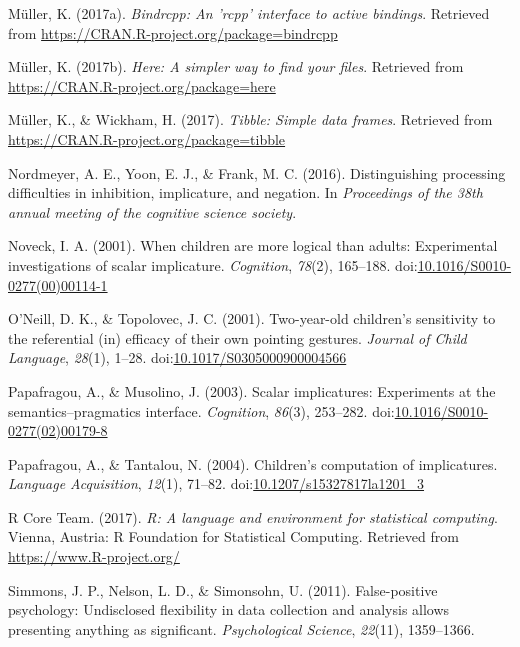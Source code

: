 \documentclass[mask,man]{apa6}
\theoremstyle{definition}
\theoremstyle{definition}
\theoremstyle{definition}
\theoremstyle{remark}
\begin{document}
\hypertarget{ref-R-bindrcpp}{}
Müller, K. (2017a). \emph{Bindrcpp: An 'rcpp' interface to active
bindings}. Retrieved from
\url{https://CRAN.R-project.org/package=bindrcpp}

\hypertarget{ref-R-here}{}
Müller, K. (2017b). \emph{Here: A simpler way to find your files}.
Retrieved from \url{https://CRAN.R-project.org/package=here}

\hypertarget{ref-R-tibble}{}
Müller, K., \& Wickham, H. (2017). \emph{Tibble: Simple data frames}.
Retrieved from \url{https://CRAN.R-project.org/package=tibble}

\hypertarget{ref-nordmeyer2016}{}
Nordmeyer, A. E., Yoon, E. J., \& Frank, M. C. (2016). Distinguishing
processing difficulties in inhibition, implicature, and negation. In
\emph{Proceedings of the 38th annual meeting of the cognitive science
society}.

\hypertarget{ref-noveck2001}{}
Noveck, I. A. (2001). When children are more logical than adults:
Experimental investigations of scalar implicature. \emph{Cognition},
\emph{78}(2), 165--188.
doi:\href{https://doi.org/10.1016/S0010-0277(00)00114-1}{10.1016/S0010-0277(00)00114-1}

\hypertarget{ref-oneill2001}{}
O'Neill, D. K., \& Topolovec, J. C. (2001). Two-year-old children's
sensitivity to the referential (in) efficacy of their own pointing
gestures. \emph{Journal of Child Language}, \emph{28}(1), 1--28.
doi:\href{https://doi.org/10.1017/S0305000900004566}{10.1017/S0305000900004566}

\hypertarget{ref-papafragou2003}{}
Papafragou, A., \& Musolino, J. (2003). Scalar implicatures: Experiments
at the semantics--pragmatics interface. \emph{Cognition}, \emph{86}(3),
253--282.
doi:\href{https://doi.org/10.1016/S0010-0277(02)00179-8}{10.1016/S0010-0277(02)00179-8}

\hypertarget{ref-papafragou2004}{}
Papafragou, A., \& Tantalou, N. (2004). Children's computation of
implicatures. \emph{Language Acquisition}, \emph{12}(1), 71--82.
doi:\href{https://doi.org/10.1207/s15327817la1201_3}{10.1207/s15327817la1201\_3}

\hypertarget{ref-R-base}{}
R Core Team. (2017). \emph{R: A language and environment for statistical
computing}. Vienna, Austria: R Foundation for Statistical Computing.
Retrieved from \url{https://www.R-project.org/}

\hypertarget{ref-simmons2011false}{}
Simmons, J. P., Nelson, L. D., \& Simonsohn, U. (2011). False-positive
psychology: Undisclosed flexibility in data collection and analysis
allows presenting anything as significant. \emph{Psychological Science},
\emph{22}(11), 1359--1366.
\end{document}
